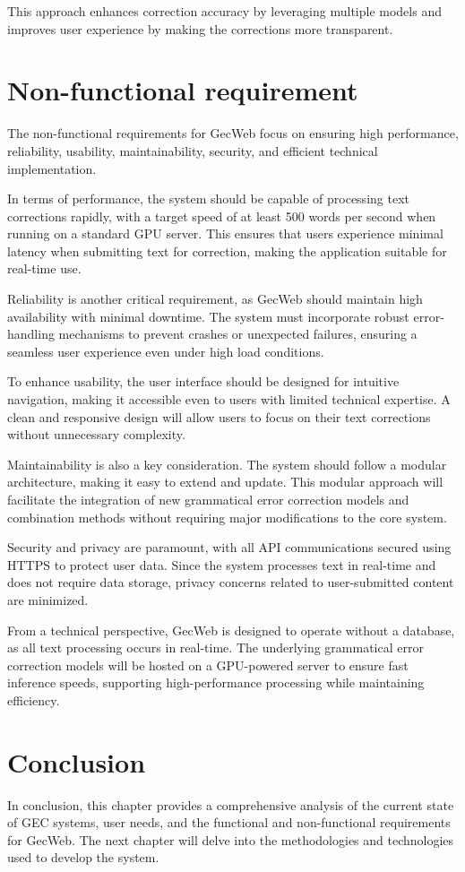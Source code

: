 This approach enhances correction accuracy by leveraging multiple models and improves user experience by making the corrections more transparent.

\section{Non-functional requirement}
\label{non-functional-requirement}

The non-functional requirements for GecWeb focus on ensuring high performance, reliability, usability, maintainability, security, and efficient technical implementation.

In terms of performance, the system should be capable of processing text corrections rapidly, with a target speed of at least 500 words per second when running on a standard GPU server.
This ensures that users experience minimal latency when submitting text for correction, making the application suitable for real-time use.

Reliability is another critical requirement, as GecWeb should maintain high availability with minimal downtime.
The system must incorporate robust error-handling mechanisms to prevent crashes or unexpected failures, ensuring a seamless user experience even under high load conditions.

To enhance usability, the user interface should be designed for intuitive navigation, making it accessible even to users with limited technical expertise.
A clean and responsive design will allow users to focus on their text corrections without unnecessary complexity.

Maintainability is also a key consideration.
The system should follow a modular architecture, making it easy to extend and update.
This modular approach will facilitate the integration of new grammatical error correction models and combination methods without requiring major modifications to the core system.

Security and privacy are paramount, with all API communications secured using HTTPS to protect user data.
Since the system processes text in real-time and does not require data storage, privacy concerns related to user-submitted content are minimized.

From a technical perspective, GecWeb is designed to operate without a database, as all text processing occurs in real-time.
The underlying grammatical error correction models will be hosted on a GPU-powered server to ensure fast inference speeds, supporting high-performance processing while maintaining efficiency.

\section{Conclusion}
\label{conclusion}

In conclusion, this chapter provides a comprehensive analysis of the current state of GEC systems, user needs, and the functional and non-functional requirements for GecWeb.
The next chapter will delve into the methodologies and technologies used to develop the system.
